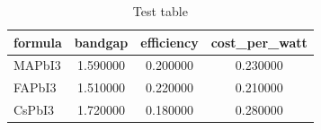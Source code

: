 \begin{table}
\caption{Test table}
\label{tab:test}
\begin{tabular}{lccc}
\toprule

formula & bandgap & efficiency & cost_per_watt \\
\midrule

MAPbI3 & 1.590000 & 0.200000 & 0.230000 \\
FAPbI3 & 1.510000 & 0.220000 & 0.210000 \\
CsPbI3 & 1.720000 & 0.180000 & 0.280000 \\
\bottomrule
\end{tabular}
\end{table}
